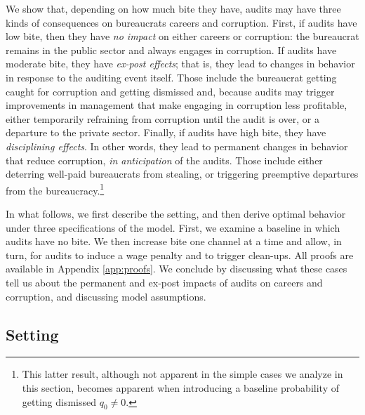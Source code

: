We show that, depending on how much bite they have, audits may have three kinds of consequences on bureaucrats careers and corruption. First, if audits have low bite, then they have \emph{no impact} on either careers or corruption: the bureaucrat remains in the public sector and always engages in corruption. If audits have moderate bite, they have \emph{ex-post effects}; that is, they lead to changes in behavior in response to the auditing event itself. Those include the bureaucrat getting caught for corruption and getting dismissed and, because audits may trigger improvements in management that make engaging in corruption less profitable, either temporarily refraining from corruption until the audit is over, or a departure to the private sector. Finally, if audits have high bite, they have \emph{disciplining effects}. In other words, they lead to permanent changes in behavior that reduce corruption, \emph{in anticipation} of the audits. Those include either deterring well-paid bureaucrats from stealing, or triggering preemptive departures from the bureaucracy.\footnote{This latter result, although not apparent in the simple cases we analyze in this section, becomes apparent when introducing a baseline probability of getting dismissed $q_0 \neq 0$.}

In what follows, we first describe the setting, and then derive optimal behavior under three specifications of the model. First, we examine a baseline in which audits have no bite. We then increase bite one channel at a time and allow, in turn, for audits to induce a wage penalty and to trigger clean-ups. All proofs are available in Appendix \ref{app:proofs}. We conclude by discussing what these cases tell us about the permanent and ex-post impacts of audits on careers and corruption, and discussing model assumptions. 

\subsection{Setting}

